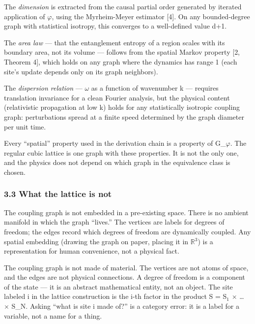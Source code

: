 \documentclass[
  11pt,
]{article}
\begin{document}
The \emph{dimension} is extracted from the causal partial order
generated by iterated application of \ensuremath{\varphi}, using the Myrheim-Meyer
estimator {[}4{]}. On any bounded-degree graph with statistical
isotropy, this converges to a well-defined value d+1.

The \emph{area law} --- that the entanglement entropy of a region scales
with its boundary area, not its volume --- follows from the spatial
Markov property {[}2, Theorem 4{]}, which holds on any graph where the
dynamics has range 1 (each site's update depends only on its graph
neighbors).

The \emph{dispersion relation} --- \ensuremath{\omega} as a function of wavenumber k ---
requires translation invariance for a clean Fourier analysis, but the
physical content (relativistic propagation at low k) holds for any
statistically isotropic coupling graph: perturbations spread at a finite
speed determined by the graph diameter per unit time.

Every ``spatial'' property used in the derivation chain is a property of
G\_\ensuremath{\varphi}. The regular cubic lattice is one graph with these properties. It
is not the only one, and the physics does not depend on which graph in
the equivalence class is chosen.

\hypertarget{what-the-lattice-is-not}{%
\subsubsection{3.3 What the lattice is
not}\label{what-the-lattice-is-not}}

The coupling graph is not embedded in a pre-existing space. There is no
ambient manifold in which the graph ``lives.'' The vertices are labels
for degrees of freedom; the edges record which degrees of freedom are
dynamically coupled. Any spatial embedding (drawing the graph on paper,
placing it in \ensuremath{\mathbb{R}}\ensuremath{^3}) is a representation for human convenience, not a
physical fact.

The coupling graph is not made of material. The vertices are not atoms
of space, and the edges are not physical connections. A degree of
freedom is a component of the state --- it is an abstract mathematical
entity, not an object. The site labeled i in the lattice construction is
the i-th factor in the product S = S\ensuremath{_1} \ensuremath{\times} \ldots{} \ensuremath{\times} S\_N. Asking ``what
is site i made of?'' is a category error: it is a label for a variable,
not a name for a thing.
\end{document}
